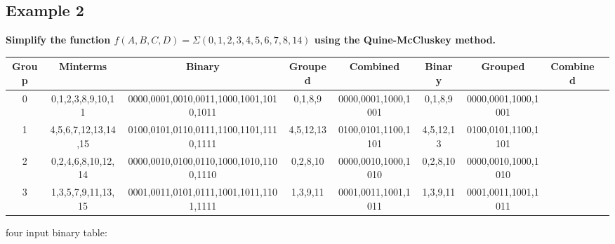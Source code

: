 \documentclass[12pt]{article}
\begin{document}
\subsection{Example 2}
\textbf{Simplify the function $f(A,B,C,D) = \Sigma(0,1,2,3,4,5,6,7,8,14)$ using the Quine-McCluskey method.}
\begin{table}[H]
	\begin{tabular}{|c|c|c|c|c|c|c|c|c|}
		\hline
		\textbf{Group} & \textbf{Minterms}   & \textbf{Binary}                         & \textbf{Grouped} & \textbf{Combined}   & \textbf{Binary} & \textbf{Grouped}    & \textbf{Combined} \\
		\hline
		0              & 0,1,2,3,8,9,10,11   & 0000,0001,0010,0011,1000,1001,1010,1011 & 0,1,8,9          & 0000,0001,1000,1001 & 0,1,8,9         & 0000,0001,1000,1001                     \\
		1              & 4,5,6,7,12,13,14,15 & 0100,0101,0110,0111,1100,1101,1110,1111 & 4,5,12,13        & 0100,0101,1100,1101 & 4,5,12,13       & 0100,0101,1100,1101                     \\
		2              & 0,2,4,6,8,10,12,14  & 0000,0010,0100,0110,1000,1010,1100,1110 & 0,2,8,10         & 0000,0010,1000,1010 & 0,2,8,10        & 0000,0010,1000,1010                     \\
		3              & 1,3,5,7,9,11,13,15  & 0001,0011,0101,0111,1001,1011,1101,1111 & 1,3,9,11         & 0001,0011,1001,1011 & 1,3,9,11        & 0001,0011,1001,1011                     \\
		\hline
	\end{tabular}
\end{table}
four input binary table:
\end{document}
